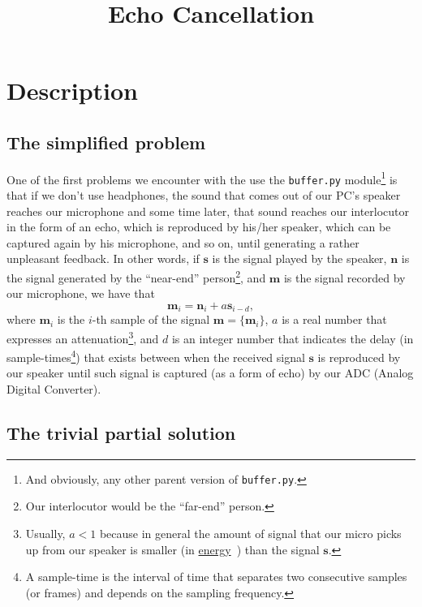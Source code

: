 
\title{Echo Cancellation}

\maketitle

\section{Description}

\subsection{The simplified problem}

One of the first problems we encounter with the use the
\texttt{buffer.py} module\footnote{And obviously, any other parent
  version of \texttt{buffer.py}.} is that if we don't use headphones,
the sound that comes out of our PC's speaker reaches our microphone
and some time later, that sound reaches our interlocutor in the form
of an echo, which is reproduced by his/her speaker, which can be captured
again by his microphone, and so on, until generating a rather
unpleasant feedback. In other words, if ${\mathbf s}$ is the signal
played by the speaker, ${\mathbf n}$ is the signal generated by the
``near-end'' person\footnote{Our interlocutor would be the ``far-end''
  person.}, and ${\mathbf m}$ is the signal recorded by our
microphone, we have that
\begin{equation}
   {\mathbf m}_i = {\mathbf n}_i + a{\mathbf s}_{i-d},
  \label{eq:echo_problem}
\end{equation}
where ${\mathbf m}_i$ is the $i$-th sample of the signal
${\mathbf m} = \{{\mathbf m}_i\}$, $a$ is a real number that expresses
an attenuation\footnote{Usually, $a<1$ because in general the amount
  of signal that our micro picks up from our speaker is smaller (in
  \href{https://en.wikipedia.org/wiki/Energy_(signal_processing)}{energy}~\cite{vetterli2014foundations})
  than the signal ${\mathbf s}$.}, and $d$ is an integer number that
indicates the delay (in sample-times\footnote{A sample-time is the
  interval of time that separates two consecutive samples (or frames)
  and depends on the sampling frequency.}) that exists between when
the received signal ${\mathbf s}$ is reproduced by our speaker until
such signal is captured (as a form of echo) by our ADC (Analog Digital
Converter).

\subsection{The trivial partial solution}

